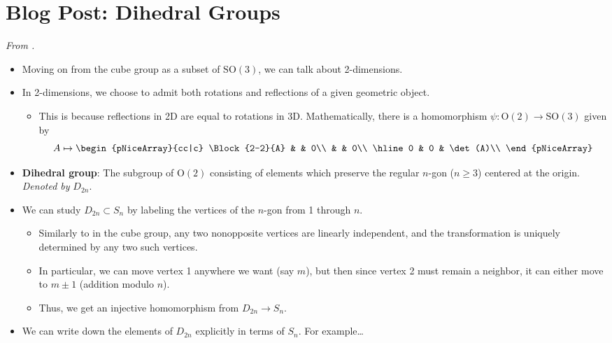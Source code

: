 \documentclass[../notes.tex]{subfiles}
\begin{document}
\section{Blog Post: Dihedral Groups}
\emph{From \textcite{bib:Calegari}.}
\begin{itemize}
    \item {}Moving on from the cube group as a subset of $\text{SO}(3)$, we can talk about 2-dimensions.
    \item In 2-dimensions, we choose to admit both rotations and reflections of a given geometric object.
    \begin{itemize}
        \item This is because reflections in 2D are equal to rotations in 3D. Mathematically, there is a homomorphism $\psi:\text{O}(2)\to\text{SO}(3)$ given by
        \begin{equation*}
            A \mapsto
            \begin{pNiceArray}{cc|c}
                \Block{2-2}{A} &  & 0\\
                 &  & 0\\
                \hline
                0 & 0 & \det(A)\\
            \end{pNiceArray}
        \end{equation*}
    \end{itemize}
    \item \textbf{Dihedral group}: The subgroup of $\text{O}(2)$ consisting of elements which preserve the regular $n$-gon ($n\geq 3$) centered at the origin. \emph{Denoted by} $D_{2n}$.
    \item We can study $D_{2n}\subset S_n$ by labeling the vertices of the $n$-gon from 1 through $n$.
    \begin{itemize}
        \item Similarly to in the cube group, any two nonopposite vertices are linearly independent, and the transformation is uniquely determined by any two such vertices.
        \item In particular, we can move vertex 1 anywhere we want (say $m$), but then since vertex 2 must remain a neighbor, it can either move to $m\pm 1$ (addition modulo $n$).
        \item Thus, we get an injective homomorphism from $D_{2n}\to S_n$.
    \end{itemize}
    \item We can write down the elements of $D_{2n}$ explicitly in terms of $S_n$. For example\dots

\end{itemize}
\end{document}
